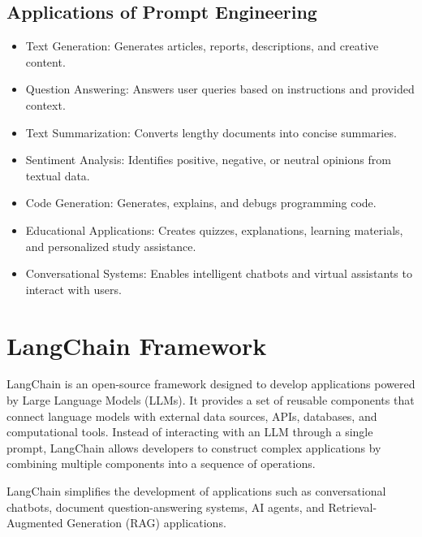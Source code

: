 \subsection{Applications of Prompt Engineering}

\begin{itemize}
    \item Text Generation: Generates articles, reports, descriptions, and creative content.
    
    \item Question Answering: Answers user queries based on instructions and provided context.
    
    \item Text Summarization: Converts lengthy documents into concise summaries.
    
    \item Sentiment Analysis: Identifies positive, negative, or neutral opinions from textual data.
    
    \item Code Generation: Generates, explains, and debugs programming code.
    
    \item Educational Applications: Creates quizzes, explanations, learning materials, and personalized study assistance.
    
    \item Conversational Systems: Enables intelligent chatbots and virtual assistants to interact with users.
\end{itemize}


\section{LangChain Framework}

LangChain is an open-source framework designed to develop applications powered by Large Language Models (LLMs). It provides a set of reusable components that connect language models with external data sources, APIs, databases, and computational tools. Instead of interacting with an LLM through a single prompt, LangChain allows developers to construct complex applications by combining multiple components into a sequence of operations.

LangChain simplifies the development of applications such as conversational chatbots, document question-answering systems, AI agents, and Retrieval-Augmented Generation (RAG) applications.

